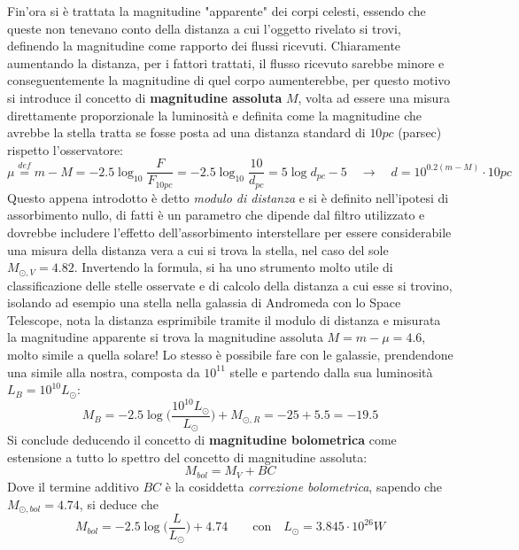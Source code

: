 \documentclass[a4paper,twoside,openany,notitlepage]{book}
\newcommand{\Def}{\overset{\mathit{def}}{=}}
\newcommand{\e}[1]{\cdot 10^{#1}}
\theoremstyle{definition}
\theoremstyle{plain}
\begin{document}
Fin'ora si è trattata la magnitudine "apparente" dei corpi celesti, essendo che queste non tenevano conto della distanza a cui l'oggetto rivelato si trovi, definendo la magnitudine come rapporto dei flussi ricevuti. Chiaramente aumentando la distanza, per i fattori trattati, il flusso ricevuto sarebbe minore e conseguentemente la magnitudine di quel corpo aumenterebbe, per questo motivo si introduce il concetto di \textbf{magnitudine assoluta} $M$, volta ad essere una misura direttamente proporzionale la luminosità e definita come la magnitudine che avrebbe la stella tratta se fosse posta ad una distanza standard di $10pc$ (parsec) rispetto l'osservatore:
\begin{equation}
	\label{def:mag-abs}
	\mu \Def m-M = -2.5 \log_{10} \frac{F}{F_{10pc}} =
	-2.5 \log_{10} \frac{10}{d_{pc}} =
	5\log d_{pc}-5 \quad \longrightarrow \quad
	d = 10^{0.2(m-M)} \cdot 10pc
\end{equation}
Questo appena introdotto è detto \textit{modulo di distanza} e si è definito nell'ipotesi di assorbimento nullo, di fatti è un parametro che dipende dal filtro utilizzato e dovrebbe includere l'effetto dell'assorbimento interstellare per essere considerabile una misura della distanza vera a cui si trova la stella, nel caso del sole $M_{\odot,V}=4.82$. Invertendo la formula, si ha uno strumento molto utile di classificazione delle stelle osservate e di calcolo della distanza a cui esse si trovino, isolando ad esempio una stella nella galassia di Andromeda con lo Space Telescope, nota la distanza esprimibile tramite il modulo di distanza e misurata la magnitudine apparente si trova la magnitudine assoluta $M=m-\mu=4.6$, molto simile a quella solare! Lo stesso è possibile fare con le galassie, prendendone una simile alla nostra, composta da $10^{11}$ stelle e partendo dalla sua luminosità $L_B=10^{10}L_\odot$:
\begin{equation*}
	M_B = -2.5 \log \biggl( \frac{10^{10}L_\odot}{L_\odot} \biggr) + M_{\odot,R} = -25 +5.5 =-19.5
\end{equation*}
Si conclude deducendo il concetto di \textbf{magnitudine bolometrica} come estensione a tutto lo spettro del concetto di magnitudine assoluta:
\begin{equation*}
	M_{bol}=M_V+BC
\end{equation*}
Dove il termine additivo $BC$ è la cosiddetta \textit{correzione bolometrica}, sapendo che $M_{\odot,bol}=4.74$, si deduce che
\begin{equation*}
	M_{bol} = -2.5 \log \biggl( \frac{L}{L_\odot} \biggr) + 4.74 \qquad
	\text{con} \quad L_\odot=3.845\e{26}W
\end{equation*}
\end{document}
